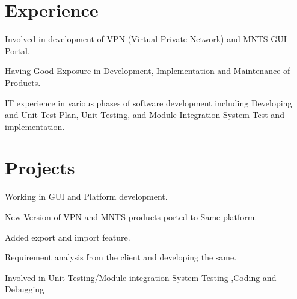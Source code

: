 \documentclass[]{prashant-resume-openfont}
\begin{document}
\begin{minipage}[t]{0.66\textwidth} 


\section{Experience}

\vspace{\topsep} %
\begin{tightemize}\item Involved in development of  VPN (Virtual Private Network) and MNTS GUI Portal.\item Having Good Exposure in Development, Implementation and Maintenance of Products.\item IT experience in various phases of software development including Developing and Unit Test Plan, Unit Testing, and Module Integration System Test and implementation.
\end{tightemize}
\sectionsep


\section{Projects}

\begin{tightemize}\item Working in GUI and Platform development.\item New Version of VPN and MNTS products ported to Same platform.\item Added export and import feature.\item Requirement analysis from the client and developing the same. \item Involved in Unit Testing/Module integration System Testing ,Coding and Debugging

\end{tightemize} 

\sectionsep



\end{minipage}
\end{document}
